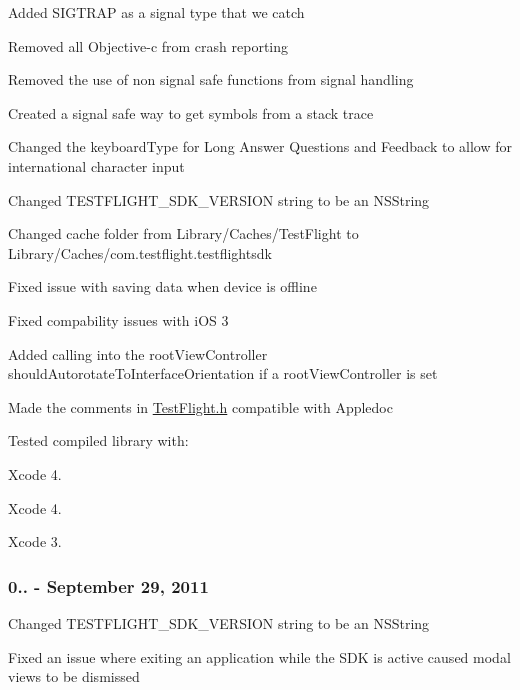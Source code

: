 \begin{DoxyItemize}
\item Added {\ttfamily S\-I\-G\-T\-R\-A\-P} as a signal type that we catch
\item Removed all Objective-\/c from crash reporting
\item Removed the use of non signal safe functions from signal handling
\item Created a signal safe way to get symbols from a stack trace
\item Changed the keyboard\-Type for Long Answer Questions and Feedback to allow for international character input
\item Changed {\ttfamily T\-E\-S\-T\-F\-L\-I\-G\-H\-T\-\_\-\-S\-D\-K\-\_\-\-V\-E\-R\-S\-I\-O\-N} string to be an {\ttfamily N\-S\-String}
\item Changed cache folder from Library/\-Caches/\-Test\-Flight to Library/\-Caches/com.\-testflight.\-testflightsdk
\item Fixed issue with saving data when device is offline
\item Fixed compability issues with i\-O\-S 3
\item Added calling into the root\-View\-Controller should\-Autorotate\-To\-Interface\-Orientation if a root\-View\-Controller is set
\item Made the comments in \hyperlink{_test_flight_8h}{Test\-Flight.\-h} compatible with Appledoc
\end{DoxyItemize}

Tested compiled library with\-:


\begin{DoxyItemize}
\item Xcode 4.
\item Xcode 4.
\item Xcode 3.
\end{DoxyItemize}

\subsubsection*{0.. -\/ September 29, 2011}


\begin{DoxyItemize}
\item Changed {\ttfamily T\-E\-S\-T\-F\-L\-I\-G\-H\-T\-\_\-\-S\-D\-K\-\_\-\-V\-E\-R\-S\-I\-O\-N} string to be an {\ttfamily N\-S\-String}
\item Fixed an issue where exiting an application while the S\-D\-K is active caused modal views to be dismissed
\end{DoxyItemize}


